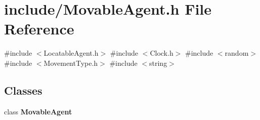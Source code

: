 \section{include/\+Movable\+Agent.h File Reference}
\label{_movable_agent_8h}
{\ttfamily \#include $<$Locatable\+Agent.\+h$>$}\newline
{\ttfamily \#include $<$Clock.\+h$>$}\newline
{\ttfamily \#include $<$random$>$}\newline
{\ttfamily \#include $<$Movement\+Type.\+h$>$}\newline
{\ttfamily \#include $<$string$>$}\newline
\subsection*{Classes}
\begin{DoxyCompactItemize}
\item 
class \textbf{ Movable\+Agent}
\end{DoxyCompactItemize}
